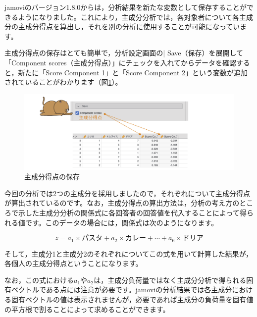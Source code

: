 \documentclass[
  12pt,
  a5jpaper,
  lualatex, ja=standard]{bxjsbook}
\begin{document}
jamoviのバージョン1.8.0からは，分析結果を新たな変数として保存することができるようになりました。これにより，主成分分析では，各対象者について各主成分の主成分得点を算出し，それを別の分析に使用することが可能になっています。

主成分得点の保存はとても簡単で，分析設定画面の\colorbox{bar}{\textcolor{gmoji2}{| Save}}（保存）を展開して「Component scores（主成分得点）」にチェックを入れてからデータを確認すると，新たに「Score Component 1」と「Score Component 2」という変数が追加されていることがわかります（図\ref{fig:factor-pca-save}）。

\begin{figure}[!ht]

{\centering \includegraphics[width=1\linewidth]{images/factor/pca-save} 

}

\caption{主成分得点の保存}\label{fig:factor-pca-save}
\end{figure}

今回の分析では2つの主成分を採用しましたので，それぞれについて主成分得点が算出されているのです。なお，主成分得点の算出方法は，分析の考え方のところで示した主成分分析の関係式に各回答者の回答値を代入することによって得られる値です。このデータの場合には，関係式は次のようになります。

\[
z = a_1 \times \text{パスタ} + a_2 \times \text{カレー} + \cdots + a_6 \times \text{ドリア}
\]

そして，主成分1と主成分2のそれぞれについてこの式を用いて計算した結果が，各個人の主成分得点ということになります。

なお，この式における\(a_1\)や\(a_2\)は，主成分負荷量ではなく主成分分析で得られる固有ベクトルである点には注意が必要です。jamoviの分析結果では各主成分における固有ベクトルの値は表示されませんが，必要であれば主成分の負荷量を固有値の平方根で割ることによって求めることができます。
\end{document}
